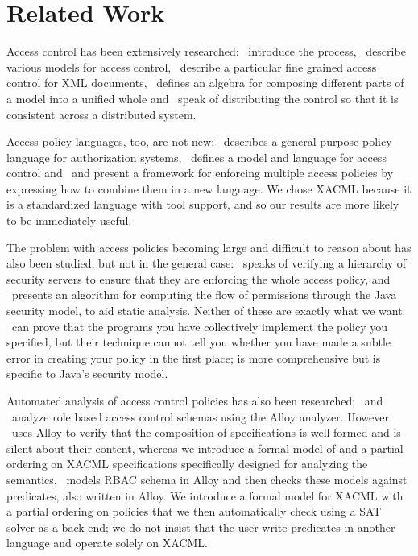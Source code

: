 \section{Related Work}
Access control has been extensively researched:
\cite{samarati01policiesmodelsmechanisms,sandhu94access,sandhu96audit}~introduce
the process,
\cite{bertino98access,bonatti01dataarchives,sandhu93latticebased,sandhu96rolebased}~describe
various models for access control,
\cite{damiani02SVG,damiani01controllingaccess,damiani02fine,damiani00design}~describe
a particular fine grained access control for XML documents,
\cite{bonatti02algebra}~defines an algebra for composing different
parts of a model into a unified whole and
\cite{abadi93calculus,heckman98applying,divimercati96federated}~speak
of distributing the control so that it is consistent across a
distributed system.

Access policy languages, too, are not new:
\cite{abadpeiro99plas}~describes a general purpose policy language for
authorization systems, \cite{jajodialogical}~defines a model and
language for access control and \cite{jajodia01multiplepolicies}~and
\cite{jajoida97unified} present a framework for enforcing multiple
access policies by expressing how to combine them in a new language.
We chose XACML because it is a standardized language with tool
support, and so our results are more likely to be immediately useful.

The problem with access policies becoming large and difficult to
reason about has also been studied, but not in the general case:
\cite{heckman98applying}~speaks of verifying a hierarchy of security
servers to ensure that they are enforcing the whole access policy,
and \cite{naumovich:permission-analysis}~presents an algorithm for
computing the flow of permissions through the Java security model, to
aid static analysis.  Neither of these are exactly what we want:
\cite{heckman98applying}~can prove that the programs you have
collectively implement the policy you specified, but their technique
cannot tell you whether you have made a subtle error in creating your
policy in the first place; \cite{naumovich:permission-analysis} is
more comprehensive but is specific to Java's security model.

Automated analysis of access control policies has also been
researched; \cite{schaad:lightweight}~and \cite{zao:rbac}~analyze role
based access control schemas using the Alloy analyzer.
However \cite{schaad:lightweight}~uses Alloy to verify that
the composition of specifications is well formed and is silent about
their content, whereas we introduce a formal model of and a partial
ordering on XACML specifications specifically designed for analyzing
the semantics.
\cite{zao:rbac}~models RBAC schema in Alloy and then
checks these models against predicates, also written in Alloy.
We introduce a formal model for XACML with a partial ordering on policies
that we then automatically check using a SAT solver as a back end; we do not
insist that the user write predicates in another language and operate
solely on XACML.

